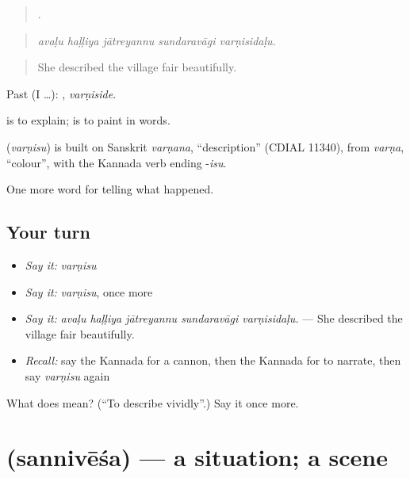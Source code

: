 \begin{quote}
    .
\end{quote}

\begin{quote}
\emph{avaḷu haḷḷiya jātreyannu sundaravāgi varṇisidaḷu.}
\end{quote}

\begin{quote}
She described the village fair beautifully.
\end{quote}

Past (I …): , \emph{varṇiside}.

 is to explain;  is to paint in words.

\begin{cousinweb}
\textbf{} (\emph{varṇisu}) is built on Sanskrit \emph{varṇana}, \textquotedblleft{}description\textquotedblright{} (CDIAL 11340), from \emph{varṇa}, \textquotedblleft{}colour\textquotedblright{}, with the Kannada verb ending -\emph{isu}.
\end{cousinweb}

\begin{grammarlens}[title={What you've built}]
One more word for telling what happened.
\end{grammarlens}

\subsection*{Your turn}
\begin{itemize}
\raggedright
  \item \emph{Say it:} \emph{varṇisu}
  \item \emph{Say it:} \emph{varṇisu}, once more
  \item \emph{Say it:} \emph{avaḷu haḷḷiya jātreyannu sundaravāgi varṇisidaḷu.} — She described the village fair beautifully.
  \item \emph{Recall:} say the Kannada for a cannon, then the Kannada for to narrate, then say \emph{varṇisu} again
\end{itemize}

\begin{tcolorbox}[breakable,colback=teal!4,colframe=teal!35!black,title={Before you move on}]
What does  mean? (\textquotedblleft{}To describe vividly\textquotedblright{}.) Say it once more.
\end{tcolorbox}
\section[\texorpdfstring{\kn{ಸನ್ನಿವೇಶ} (sannivēśa)}{ಸನ್ನಿವೇಶ (sannivēśa)}]{ (sannivēśa) — a situation; a scene}

